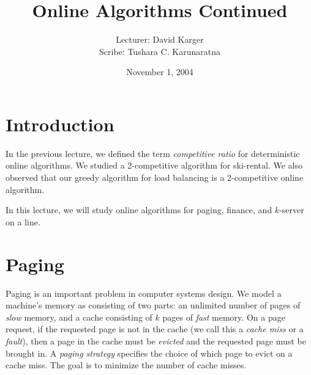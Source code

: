 \documentclass{article}
\title{Online Algorithms Continued}
\date{November 1, 2004}
\author{Lecturer: David Karger\\ Scribe: Tushara C. Karunaratna}
\begin{document}
%
%
%
%

%



\section{Introduction}
In the previous lecture, we defined the term \emph{competitive ratio}
for deterministic online algorithms.
We studied a 2-competitive algorithm for ski-rental.
We also observed that our greedy algorithm for load balancing is a
2-competitive online algorithm.

In this lecture, we will study online algorithms for paging, finance,
and $k$-server on a line.



\section{Paging}
Paging is an important problem in computer systems design.
We model a machine's memory as consisting of two parts: 
an unlimited number of pages of \emph{slow} memory, 
and a cache consisting of $k$ pages of \emph{fast} memory.
On a page request, if the requested page is not in the cache (we call
this a \emph{cache miss } or a \emph{fault}), then a
page in the cache must be \emph{evicted} and the requested page must
be brought in.
A \emph{paging strategy} specifies the choice of which page to evict
on a cache miss.
The goal is to minimize the number of cache misses.
\end{document}
